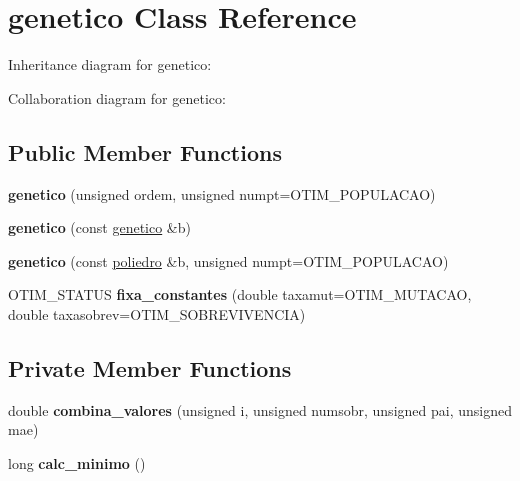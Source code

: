 \hypertarget{classgenetico}{}\section{genetico Class Reference}
\label{classgenetico}


Inheritance diagram for genetico\+:


Collaboration diagram for genetico\+:
\subsection*{Public Member Functions}
\begin{DoxyCompactItemize}
\item 
{\bfseries genetico} (unsigned ordem, unsigned numpt=O\+T\+I\+M\+\_\+\+P\+O\+P\+U\+L\+A\+C\+AO)\hypertarget{classgenetico_a5118a61920270eff32df3cf6e07f607d}{}\label{classgenetico_a5118a61920270eff32df3cf6e07f607d}

\item 
{\bfseries genetico} (const \hyperlink{classgenetico}{genetico} \&b)\hypertarget{classgenetico_a7fbd4aad2058a9c99db7954ff58fa839}{}\label{classgenetico_a7fbd4aad2058a9c99db7954ff58fa839}

\item 
{\bfseries genetico} (const \hyperlink{classpoliedro}{poliedro} \&b, unsigned numpt=O\+T\+I\+M\+\_\+\+P\+O\+P\+U\+L\+A\+C\+AO)\hypertarget{classgenetico_a5045f556fa7f7d11f932144d64e55f0d}{}\label{classgenetico_a5045f556fa7f7d11f932144d64e55f0d}

\item 
O\+T\+I\+M\+\_\+\+S\+T\+A\+T\+US {\bfseries fixa\+\_\+constantes} (double taxamut=O\+T\+I\+M\+\_\+\+M\+U\+T\+A\+C\+AO, double taxasobrev=O\+T\+I\+M\+\_\+\+S\+O\+B\+R\+E\+V\+I\+V\+E\+N\+C\+IA)\hypertarget{classgenetico_a3c5f294bdcf828a169a87369f49b09bf}{}\label{classgenetico_a3c5f294bdcf828a169a87369f49b09bf}

\end{DoxyCompactItemize}
\subsection*{Private Member Functions}
\begin{DoxyCompactItemize}
\item 
double {\bfseries combina\+\_\+valores} (unsigned i, unsigned numsobr, unsigned pai, unsigned mae)\hypertarget{classgenetico_a589a9ba9673529e91678b5d5b5e65d91}{}\label{classgenetico_a589a9ba9673529e91678b5d5b5e65d91}

\item 
long {\bfseries calc\+\_\+minimo} ()\hypertarget{classgenetico_aa3aec13f7e988ae7294fda223fd7dc56}{}\label{classgenetico_aa3aec13f7e988ae7294fda223fd7dc56}

\end{DoxyCompactItemize}
